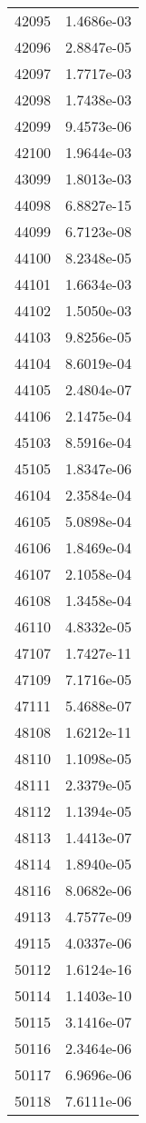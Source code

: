 \begin{table}[h!]
\begin{tabular}{|| c || c |}
42095 & 1.4686e-03 \\
42096 & 2.8847e-05 \\
42097 & 1.7717e-03 \\
42098 & 1.7438e-03 \\
42099 & 9.4573e-06 \\
42100 & 1.9644e-03 \\
43099 & 1.8013e-03 \\
44098 & 6.8827e-15 \\
44099 & 6.7123e-08 \\
44100 & 8.2348e-05 \\
44101 & 1.6634e-03 \\
44102 & 1.5050e-03 \\
44103 & 9.8256e-05 \\
44104 & 8.6019e-04 \\
44105 & 2.4804e-07 \\
44106 & 2.1475e-04 \\
45103 & 8.5916e-04 \\
45105 & 1.8347e-06 \\
46104 & 2.3584e-04 \\
46105 & 5.0898e-04 \\
46106 & 1.8469e-04 \\
46107 & 2.1058e-04 \\
46108 & 1.3458e-04 \\
46110 & 4.8332e-05 \\
47107 & 1.7427e-11 \\
47109 & 7.1716e-05 \\
47111 & 5.4688e-07 \\
48108 & 1.6212e-11 \\
48110 & 1.1098e-05 \\
48111 & 2.3379e-05 \\
48112 & 1.1394e-05 \\
48113 & 1.4413e-07 \\
48114 & 1.8940e-05 \\
48116 & 8.0682e-06 \\
49113 & 4.7577e-09 \\
49115 & 4.0337e-06 \\
50112 & 1.6124e-16 \\
50114 & 1.1403e-10 \\
50115 & 3.1416e-07 \\
50116 & 2.3464e-06 \\
50117 & 6.9696e-06 \\
50118 & 7.6111e-06 \\

\end{tabular}
\end{table}
